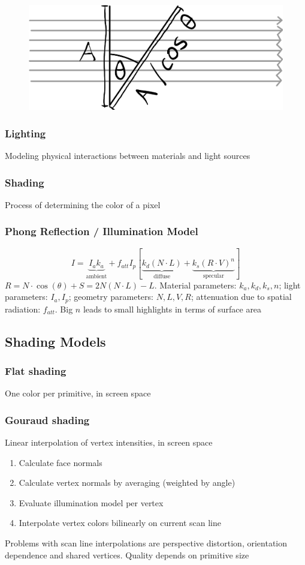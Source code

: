 \documentclass[a4paper,10pt]{article}
\begin{document}
\begin{figure}[ht]
    \centering
    \includegraphics[width=0.4\linewidth]{lamberts-law.jpeg}
\end{figure}
\subsubsection{Lighting} Modeling physical interactions between materials and light sources
\subsubsection{Shading} Process of determining the color of a pixel
\subsubsection{Phong Reflection / Illumination Model} 
\[
    I = \underbrace{I_a k_a}_{\text{ambient}} + f_{att} I_p [\underbrace{k_d(N\cdot L)}_{\text{diffuse}} + \underbrace{k_s(R\cdot V)^n}_{\text{specular}}]
\] 
\( R = N \cdot \cos (\theta) + S = 2N(N\cdot L) - L \).
Material parameters: \( k_a, k_d, k_s, n \);
light parameters: \( I_a, I_p \);
geometry parameters: \( N, L, V, R \); attenuation due to spatial radiation: \( f_{att} \). Big \( n \) leads to small highlights in terms of surface area

\subsection{Shading Models}
\subsubsection{Flat shading} One color per primitive, in screen space
\subsubsection{Gouraud shading} Linear interpolation of vertex intensities, in screen space
\begin{enumerate}
    \item Calculate face normals
    \item Calculate vertex normals by averaging (weighted by angle)
    \item Evaluate illumination model per vertex
    \item Interpolate vertex colors bilinearly on current scan line
\end{enumerate}
Problems with scan line interpolations are perspective distortion, orientation dependence and shared vertices. Quality depends on primitive size
\end{document}
